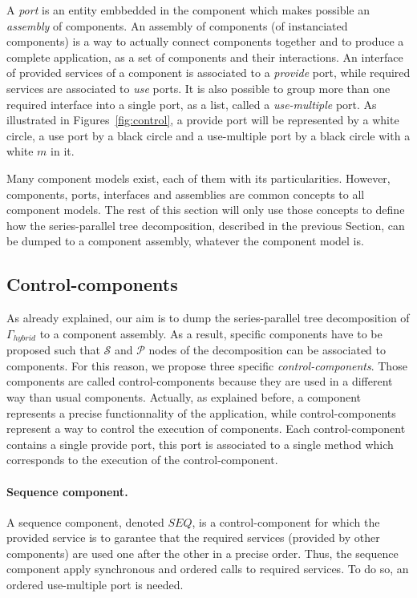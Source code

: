 A \emph{port} is an entity embbedded in the component which makes possible an \emph{assembly} of components. An assembly of components (of instanciated components) is a way to actually connect components together and to produce a complete application, as a set of components and their interactions. An interface of provided services of a component is associated to a \emph{provide} port, while required services are associated to \emph{use} ports. It is also possible to group more than one required interface into a single port, as a list, called a \emph{use-multiple} port. As illustrated in Figures~\ref{fig:control}, a provide port will be represented by a white circle, a use port by a black circle and a use-multiple port by a black circle with a white $m$ in it.

Many component models exist, each of them with its particularities. However, components, ports, interfaces and assemblies are common concepts to all component models. The rest of this section will only use those concepts to define how the series-parallel tree decomposition, described in the previous Section, can be dumped to a component assembly, whatever the component model is.

\subsection{Control-components}
As already explained, our aim is to dump the series-parallel tree decomposition of $\Gamma_{hybrid}$ to a component assembly. As a result, specific components have to be proposed such that $\mathcal{S}$ and $\mathcal{P}$ nodes of the decomposition can be associated to components. For this reason, we propose three specific \emph{control-components}. Those components are called control-components because they are used in a different way than usual components. Actually, as explained before, a component represents a precise functionnality of the application, while control-components represent a way to control the execution of components. Each control-component contains a single provide port, this port is associated to a single method which corresponds to the execution of the control-component.

\paragraph{Sequence component.} A sequence component, denoted $SEQ$, is a control-component for which the provided service is to garantee that the required services (provided by other components) are used one after the other in a precise order. Thus, the sequence component apply synchronous and ordered calls to required services. To do so, an ordered use-multiple port is needed.

